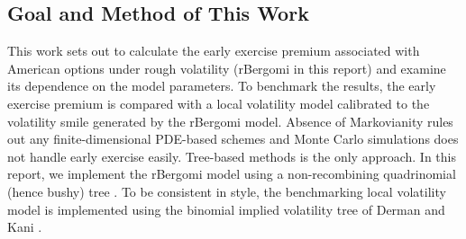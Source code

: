 \documentclass[12pt]{article}
\numberwithin{equation}{section}
\begin{document}
\subsection{Goal and Method of This Work}
This work sets out to calculate the early exercise premium associated with American options under rough volatility (rBergomi in this report) and examine its dependence on the model parameters. To benchmark the results, the early exercise premium is compared with a local volatility model calibrated to the volatility smile generated by the rBergomi model. Absence of Markovianity rules out any finite-dimensional PDE-based schemes and Monte Carlo simulations does not handle early exercise easily. Tree-based methods is the only approach. In this report, we implement the rBergomi model using a non-recombining quadrinomial (hence bushy) tree \cite{horvath}. To be consistent in style, the benchmarking local volatility model is implemented using the binomial implied volatility tree of Derman and Kani \cite{derman}.
\end{document}
